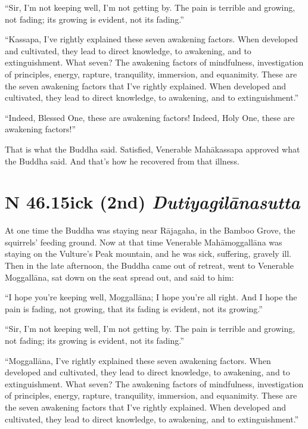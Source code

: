 \documentclass[12pt,openany]{book}%
\newcommand*{\suttatitleacronym}[1]{\smaller[2]{#1}\vspace*{.3em}}
\newcommand*{\suttatitletranslation}[1]{\linebreak{#1}}
\newcommand*{\suttatitleroot}[1]{\linebreak\smaller[2]\itshape{#1}}
\newcommand*{\tocacronym}[1]{\hspace*{-3.3em}{#1}\quad}
\newcommand*{\toctranslation}[1]{#1}
\newcommand*{\tocroot}[1]{(\textit{#1})}
\begin{document}
“Sir, I’m not keeping well, I’m not getting by. The pain is terrible and growing, not fading; its growing is evident, not its fading.” 

“Kassapa, I’ve rightly explained these seven awakening factors. When developed and cultivated, they lead to direct knowledge, to awakening, and to extinguishment. What seven? The awakening factors of mindfulness, investigation of principles, energy, rapture, tranquility, immersion, and equanimity. These are the seven awakening factors that I’ve rightly explained. When developed and cultivated, they lead to direct knowledge, to awakening, and to extinguishment.” 

“Indeed, Blessed One, these are awakening factors! Indeed, Holy One, these are awakening factors!” 

That is what the Buddha said. Satisfied, Venerable \textsanskrit{Mahākassapa} approved what the Buddha said. And that’s how he recovered from that illness. 

%
\section*{{\suttatitleacronym SN 46.15}{\suttatitletranslation Sick (2nd) }{\suttatitleroot Dutiyagilānasutta}}
\addcontentsline{toc}{section}{\tocacronym{SN 46.15} \toctranslation{Sick (2nd) } \tocroot{Dutiyagilānasutta}}

At one time the Buddha was staying near \textsanskrit{Rājagaha}, in the Bamboo Grove, the squirrels’ feeding ground. Now at that time Venerable \textsanskrit{Mahāmoggallāna} was staying on the Vulture’s Peak mountain, and he was sick, suffering, gravely ill. Then in the late afternoon, the Buddha came out of retreat, went to Venerable \textsanskrit{Moggallāna}, sat down on the seat spread out, and said to him: 

“I hope you’re keeping well, \textsanskrit{Moggallāna}; I hope you’re all right. And I hope the pain is fading, not growing, that its fading is evident, not its growing.” 

“Sir, I’m not keeping well, I’m not getting by. The pain is terrible and growing, not fading; its growing is evident, not its fading.” 

“\textsanskrit{Moggallāna}, I’ve rightly explained these seven awakening factors. When developed and cultivated, they lead to direct knowledge, to awakening, and to extinguishment. What seven? The awakening factors of mindfulness, investigation of principles, energy, rapture, tranquility, immersion, and equanimity. These are the seven awakening factors that I’ve rightly explained. When developed and cultivated, they lead to direct knowledge, to awakening, and to extinguishment.” 
\end{document}
